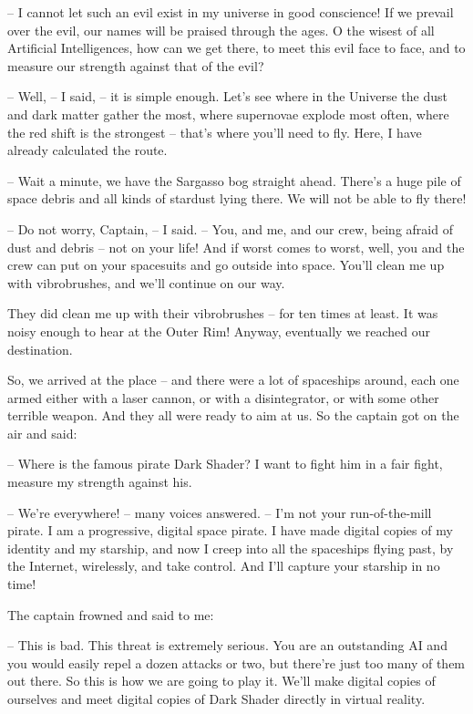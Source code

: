 \documentclass[ebook,oneside,final,openright]{memoir}
\begin{document}
– I cannot let such an evil exist in my universe in good conscience! If we prevail over the evil, our names will be praised through the ages. O the wisest of all Artificial Intelligences, how can we get there, to meet this evil face to face, and to measure our strength against that of the evil?\par
– Well, – I said, – it is simple enough. Let’s see where in the Universe the dust and dark matter gather the most, where supernovae explode most often, where the red shift is the strongest – that’s where you’ll need to fly. Here, I have already calculated the route.\par
– Wait a minute, we have the Sargasso bog straight ahead. There’s a huge pile of space debris and all kinds of stardust lying there. We will not be able to fly there!\par
– Do not worry, Captain, – I said. – You, and me, and our crew, being afraid of dust and debris – not on your life! And if worst comes to worst, well, you and the crew can put on your spacesuits and go outside into space. You’ll clean me up with vibrobrushes, and we’ll continue on our way.\par
\par
They did clean me up with their vibrobrushes – for ten times at least. It was noisy enough to hear at the Outer Rim! Anyway, eventually we reached our destination.\par
\par
So, we arrived at the place – and there were a lot of spaceships around, each one armed either with a laser cannon, or with a disintegrator, or with some other terrible weapon. And they all were ready to aim at us. So the captain got on the air and said:\par
– Where is the famous pirate Dark Shader? I want to fight him in a fair fight, measure my strength against his.\par
– We’re everywhere! – many voices answered. – I’m not your run-of-the-mill pirate. I am a progressive, digital space pirate. I have made digital copies of my identity and my starship, and now I creep into all the spaceships flying past, by the Internet, wirelessly, and take control. And I’ll capture your starship in no time!\par
\par
The captain frowned and said to me:\par
– This is bad. This threat is extremely serious. You are an outstanding AI and you would easily repel a dozen attacks or two, but there’re just too many of them out there. So this is how we are going to play it. We’ll make digital copies of ourselves and meet digital copies of Dark Shader directly in virtual reality.\par
\end{document}
